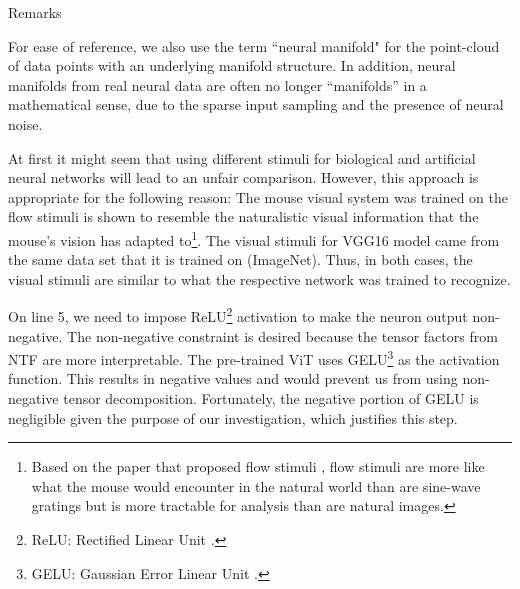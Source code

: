 \documentclass[xcolor={dvipsnames,svgnames}]{beamer}
\begin{document}
\begin{frame}[allowframebreaks]{Remarks}
\begin{rmk}
For ease of reference, we also use the term ``neural manifold" for the point-cloud of data points with an underlying manifold structure. In addition, neural manifolds from real neural data are often no longer ``manifolds” in a mathematical sense, due to the sparse input sampling and the presence of neural noise. 
\end{rmk}
    
\begin{rmk}
At first it might seem that using different stimuli for biological and artificial neural networks will lead to an unfair comparison. However, this approach is appropriate for the following reason: The mouse visual system was trained on the flow stimuli is shown to resemble the naturalistic visual information that the mouse's vision has adapted to\footnote{Based on the paper that proposed flow stimuli \cite{visual-flow}, flow stimuli are more like what the mouse would encounter in the natural world than are sine-wave gratings but is more tractable for analysis than are natural images.}. The visual stimuli for VGG16 model came from the same data set that it is trained on (ImageNet). Thus, in both cases, the visual stimuli are similar to what the respective network was trained to recognize.
\end{rmk}

\begin{rmk}
On line 5, we need to impose ReLU\footnote{ReLU: Rectified Linear Unit \cite{relu}.} activation to make the neuron output non-negative. The non-negative constraint is desired because the tensor factors from NTF are more interpretable. The pre-trained ViT uses GELU\footnote{GELU: Gaussian Error Linear Unit \cite{gelu}.} as the activation function. This results in negative values and would prevent us from using non-negative tensor decomposition. Fortunately, the negative portion of GELU is negligible given the purpose of our investigation, which justifies this step.
\end{rmk}

\end{frame}
\end{document}
